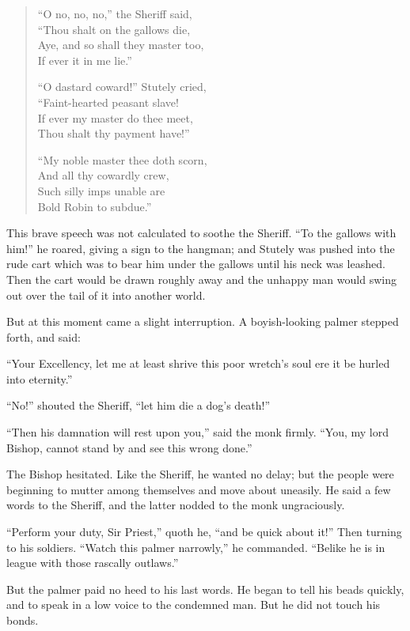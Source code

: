 \begin{quote}
“O no, no, no,” the Sheriff said,\\
“Thou shalt on the gallows die,\\
Aye, and so shall they master too,\\
If ever it in me lie.”

“O dastard coward!” Stutely cried,\\
“Faint-hearted peasant slave!\\
If ever my master do thee meet,\\
Thou shalt thy payment have!”

“My noble master thee doth scorn,\\
And all thy cowardly crew,\\
Such silly imps unable are\\
Bold Robin to subdue.”
\end{quote}

This brave speech was not calculated to soothe the Sheriff. ``To the
gallows with him!'' he roared, giving a sign to the hangman; and Stutely
was pushed into the rude cart which was to bear him under the gallows
until his neck was leashed. Then the cart would be drawn roughly away
and the unhappy man would swing out over the tail of it into another
world.

But at this moment came a slight interruption. A boyish-looking palmer
stepped forth, and said:

``Your Excellency, let me at least shrive this poor wretch's soul ere it
be hurled into eternity.''

``No!'' shouted the Sheriff, ``let him die a dog's death!''

``Then his damnation will rest upon you,'' said the monk firmly. ``You,
my lord Bishop, cannot stand by and see this wrong done.''

The Bishop hesitated. Like the Sheriff, he wanted no delay; but the
people were beginning to mutter among themselves and move about
uneasily. He said a few words to the Sheriff, and the latter nodded to
the monk ungraciously.

``Perform your duty, Sir Priest,'' quoth he, ``and be quick about it!''
Then turning to his soldiers. ``Watch this palmer narrowly,'' he
commanded. ``Belike he is in league with those rascally outlaws.''

But the palmer paid no heed to his last words. He began to tell his
beads quickly, and to speak in a low voice to the condemned man. But he
did not touch his bonds.

